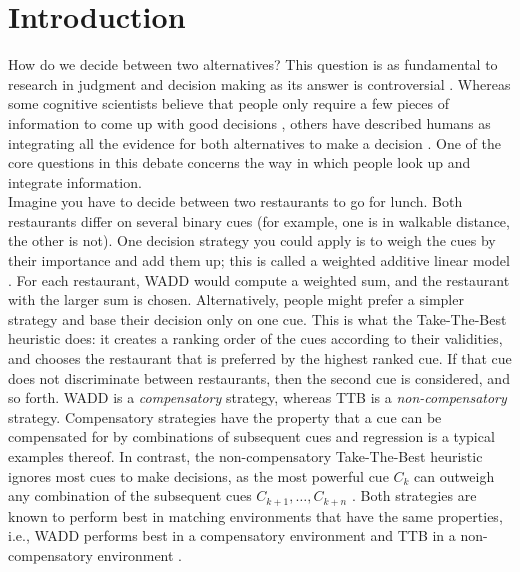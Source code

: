 \documentclass[10pt,letterpaper]{article}
\begin{document}
\section{Introduction}
How do we decide between two alternatives? This question is as fundamental to research in judgment and decision making as its answer is controversial \citep{todd2000precis}. Whereas some cognitive scientists believe that people only require a few pieces of information to come up with good decisions \citep{marewski2010good}, others have described humans as integrating all the evidence for both alternatives to make a decision \citep{arkes1986factors} . One of the core questions in this debate concerns the way in which people look up and integrate information.\\
Imagine you have to decide between two restaurants to go for lunch. Both restaurants differ on several binary cues (for example, one is in walkable distance, the other is not). One decision strategy you could apply is to weigh the cues by their importance and add them up; this is called a weighted additive linear model \citep[WADD]{payne1993adaptive}. For each restaurant, WADD would compute a weighted sum, and the restaurant with the larger sum is chosen. Alternatively, people might prefer a simpler strategy and base their decision only on one cue. This is what the Take-The-Best heuristic \citep[TTB]{gigerenzer1996reasoning} does: it creates a ranking order of the cues according to their validities, and chooses the restaurant that is preferred by the highest ranked cue. If that cue does not discriminate between restaurants, then the second cue is considered, and so forth. WADD is a \textit{compensatory} strategy, whereas TTB is a \textit{non-compensatory} strategy. Compensatory strategies have the property that a cue can be compensated for by combinations of subsequent cues and regression is a typical examples thereof. In contrast, the non-compensatory Take-The-Best heuristic ignores most cues to make decisions, as the most powerful cue $C_k$ can outweigh any combination of the subsequent cues $C_{k+1},\dots,C_{k+n}$ \citep{gigerenzer1999betting}. Both strategies are known to perform best in matching environments that have the same properties, i.e., WADD performs best in a compensatory environment and TTB in a non-compensatory environment \citep{martignon1999does}. 
\end{document}
